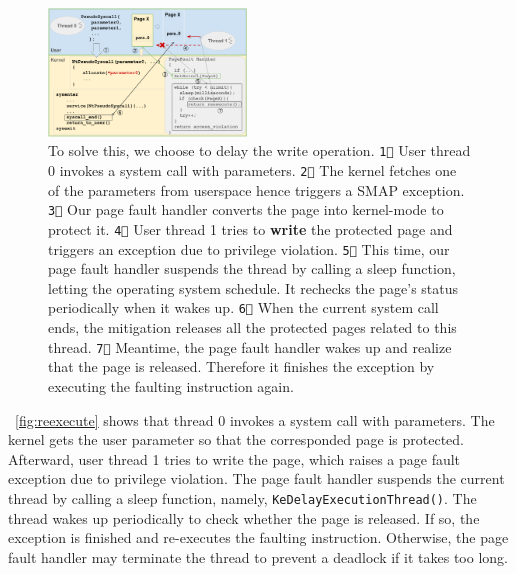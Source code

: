 \begin{figure}[th]
  \includegraphics[width=0.47\textwidth]{figures/reexecute2}
  \centering
  \caption{To solve this, we choose to delay the write operation. \texttt{\textcircled{1}}  User thread 0 invokes a system call with parameters. \texttt{\textcircled{2}} The kernel fetches one of the parameters from userspace hence triggers a SMAP exception. \texttt{\textcircled{3}} Our page fault handler converts the page into kernel-mode to protect it.  \texttt{\textcircled{4}} User thread 1 tries to \textbf{write} the protected page and triggers an exception due to privilege violation. \texttt{\textcircled{5}} This time, our page fault handler suspends the thread by calling a sleep function, letting the operating system schedule.  It rechecks the page's status periodically when it wakes up. \texttt{\textcircled{6}} When the current system call ends, the mitigation releases all the protected pages related to this thread. \texttt{\textcircled{7}} Meantime, the page fault handler wakes up and realize that the page is released. Therefore it finishes the exception by executing the faulting instruction again.}
  \label{fig:reexecute}
\end{figure}

~\autoref{fig:reexecute} shows that thread 0 invokes a system call with parameters. The kernel gets the user parameter so that the corresponded page is protected. Afterward, user thread 1 tries to write the page, which raises a page fault exception due to privilege violation. The page fault handler suspends the current thread by calling a sleep function, namely, \texttt{KeDelayExecutionThread()}. The thread wakes up periodically to check whether the page is released. If so, the exception is finished and re-executes the faulting instruction. Otherwise, the page fault handler may terminate the thread to prevent a deadlock if it takes too long.




